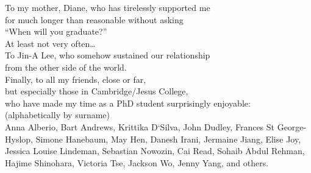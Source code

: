 \documentclass[thesis]{subfiles}
\begin{document}

\begin{dedication}
To my mother, Diane, who has tirelessly supported me\\
for much longer than reasonable without asking\\
``When will you graduate?''\\
At least not very often\ldots\\
\vspace{0.33\textheight minus 10ex}
To Jin-A Lee, who somehow sustained our relationship\\
from the other side of the world.\\
\vspace{0.11\textheight minus 10ex}
Finally, to all my friends, close or far,\\
but especially those in Cambridge/Jesus College,\\
who have made my time as a PhD student surprisingly enjoyable:\\
\vspace{1em}
{\small(alphabetically by surname)}\\
\vspace{0.5em}
Anna Alberio,
Bart Andrews,
Krittika D`Silva,
John Dudley,
Frances St George-Hyslop,
Simone Hanebaum,
May Hen,
Danesh Irani,
Jermaine Jiang,
Elise Joy,
Jessica Louise Lindeman,
Sebastian Nowozin,
Cai Read,
Sohaib Abdul Rehman,
Hajime Shinohara,
Victoria Tse,
Jackson Wo,
Jenny Yang,
and others.
\end{dedication}
\end{document}
